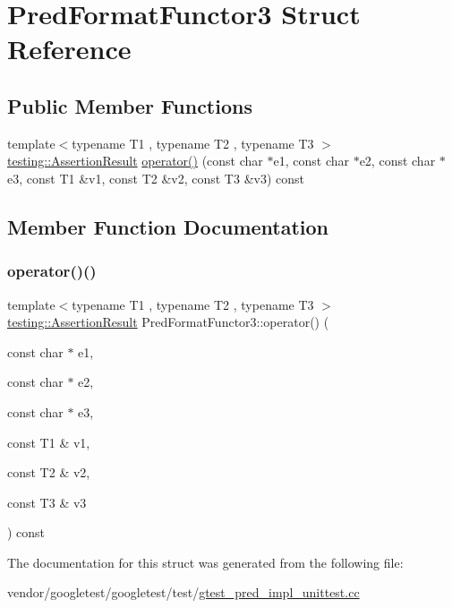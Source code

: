 \hypertarget{struct_pred_format_functor3}{}\section{Pred\+Format\+Functor3 Struct Reference}
\label{struct_pred_format_functor3}
\subsection*{Public Member Functions}
\begin{DoxyCompactItemize}
\item 
{\footnotesize template$<$typename T1 , typename T2 , typename T3 $>$ }\\\hyperlink{classtesting_1_1_assertion_result}{testing\+::\+Assertion\+Result} \hyperlink{struct_pred_format_functor3_a35575b0ed1e572d3a31603b07a3f6b30}{operator()} (const char $\ast$e1, const char $\ast$e2, const char $\ast$e3, const T1 \&v1, const T2 \&v2, const T3 \&v3) const
\end{DoxyCompactItemize}


\subsection{Member Function Documentation}
\mbox{\label{struct_pred_format_functor3_a35575b0ed1e572d3a31603b07a3f6b30}} 
\subsubsection{\texorpdfstring{operator()()}{operator()()}}
{\footnotesize\ttfamily template$<$typename T1 , typename T2 , typename T3 $>$ \\
\hyperlink{classtesting_1_1_assertion_result}{testing\+::\+Assertion\+Result} Pred\+Format\+Functor3\+::operator() (\begin{DoxyParamCaption}\item[{const char $\ast$}]{e1,  }\item[{const char $\ast$}]{e2,  }\item[{const char $\ast$}]{e3,  }\item[{const T1 \&}]{v1,  }\item[{const T2 \&}]{v2,  }\item[{const T3 \&}]{v3 }\end{DoxyParamCaption}) const\hspace{0.3cm}{\ttfamily [inline]}}



The documentation for this struct was generated from the following file\+:\begin{DoxyCompactItemize}
\item 
vendor/googletest/googletest/test/\hyperlink{gtest__pred__impl__unittest_8cc}{gtest\+\_\+pred\+\_\+impl\+\_\+unittest.\+cc}\end{DoxyCompactItemize}
